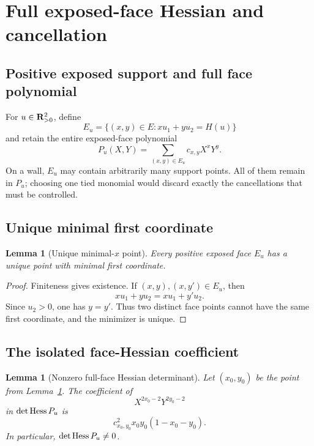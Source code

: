 \documentclass[11pt]{article}
\newtheorem{lemma}[theorem]{Lemma}
\theoremstyle{definition}
\theoremstyle{remark}
\begin{document}
\section{Full exposed-face Hessian and cancellation}

\subsection{Positive exposed support and full face polynomial}

For \(u\in\mathbf{R}_{>0}^2\), define
\[
E_u=\{(x,y)\in E:xu_1+yu_2=H(u)\}
\]
and retain the entire exposed-face polynomial
\[
P_u(X,Y)=\sum_{(x,y)\in E_u}c_{x,y}X^xY^y.
\]
On a wall, \(E_u\) may contain arbitrarily many support points.  All of
them remain in \(P_u\); choosing one tied monomial would discard exactly
the cancellations that must be controlled.

\subsection{Unique minimal first coordinate}

\begin{lemma}[Unique minimal-\(x\) point]\label{lem:minimal-x}
Every positive exposed face \(E_u\) has a unique point with minimal first
coordinate.
\end{lemma}

\begin{proof}
Finiteness gives existence.  If \((x,y),(x,y')\in E_u\), then
\[
xu_1+yu_2=xu_1+y'u_2.
\]
Since \(u_2>0\), one has \(y=y'\).  Thus two distinct face points cannot
have the same first coordinate, and the minimizer is unique.
\end{proof}

\subsection{The isolated face-Hessian coefficient}

\begin{lemma}[Nonzero full-face Hessian determinant]\label{lem:hessian}
Let \((x_0,y_0)\) be the point from Lemma~\ref{lem:minimal-x}.  The
coefficient of
\[
X^{2x_0-2}Y^{2y_0-2}
\]
in \(\det\operatorname{Hess} P_u\) is
\[
c_{x_0,y_0}^2x_0y_0(1-x_0-y_0).
\]
In particular, \(\det\operatorname{Hess} P_u\neq0\).
\end{lemma}
\end{document}
